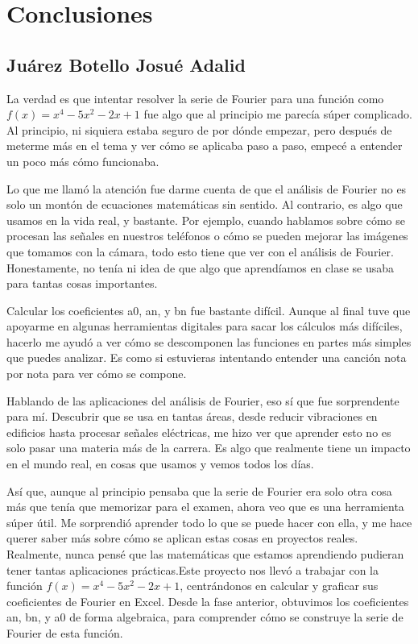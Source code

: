 
\section{Conclusiones}
\subsection{Juárez Botello Josué Adalid}

La verdad es que intentar resolver la serie de Fourier para una función como \(f(x)=x^4-5x^2-2x+1\) fue algo que al principio me parecía súper complicado. Al principio, ni siquiera estaba seguro de por dónde empezar, pero después de meterme más en el tema y ver cómo se aplicaba paso a paso, empecé a entender un poco más cómo funcionaba.

Lo que me llamó la atención fue darme cuenta de que el análisis de Fourier no es solo un montón de ecuaciones matemáticas sin sentido. Al contrario, es algo que usamos en la vida real, y bastante. Por ejemplo, cuando hablamos sobre cómo se procesan las señales en nuestros teléfonos o cómo se pueden mejorar las imágenes que tomamos con la cámara, todo esto tiene que ver con el análisis de Fourier. Honestamente, no tenía ni idea de que algo que aprendíamos en clase se usaba para tantas cosas importantes.

Calcular los coeficientes a0, an, y bn fue bastante difícil. Aunque al final tuve que apoyarme en algunas herramientas digitales para sacar los cálculos más difíciles, hacerlo me ayudó a ver cómo se descomponen las funciones en partes más simples que puedes analizar. Es como si estuvieras intentando entender una canción nota por nota para ver cómo se compone.

Hablando de las aplicaciones del análisis de Fourier, eso sí que fue sorprendente para mí. Descubrir que se usa en tantas áreas, desde reducir vibraciones en edificios hasta procesar señales eléctricas, me hizo ver que aprender esto no es solo pasar una materia más de la carrera. Es algo que realmente tiene un impacto en el mundo real, en cosas que usamos y vemos todos los días.

Así que, aunque al principio pensaba que la serie de Fourier era solo otra cosa más que tenía que memorizar para el examen, ahora veo que es una herramienta súper útil. Me sorprendió aprender todo lo que se puede hacer con ella, y me hace querer saber más sobre cómo se aplican estas cosas en proyectos reales. Realmente, nunca pensé que las matemáticas que estamos aprendiendo pudieran tener tantas aplicaciones prácticas.Este proyecto nos llevó a trabajar con la función \(f(x)=x^4-5x^2-2x+1\), centrándonos en calcular y graficar sus coeficientes de Fourier en Excel. Desde la fase anterior, obtuvimos los coeficientes an\hspace{0pt}, bn, y a0 de forma algebraica, para comprender cómo se construye la serie de Fourier de esta función.


